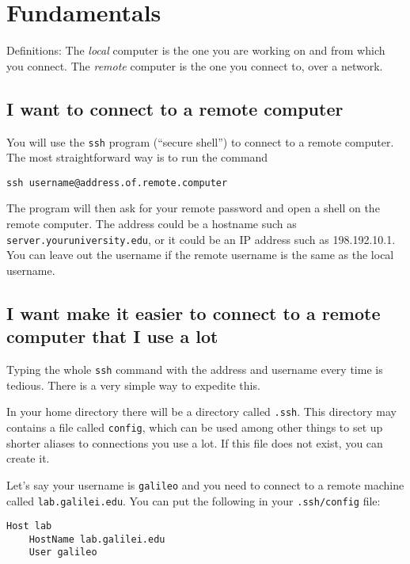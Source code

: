 \section{Fundamentals}

Definitions: The \emph{local} computer is the one you are working on and from
which you connect. The \emph{remote} computer is the one you connect to, over a
network.

\subsection{I want to connect to a remote computer}

You will use the {\tt ssh} program (``secure shell'') to connect to a remote
computer. The most straightforward way is to run the command

\begin{verbatim}
ssh username@address.of.remote.computer
\end{verbatim}

The program will then ask for your remote password and open a shell on the
remote computer. The address could be a hostname such as {\tt
server.youruniversity.edu}, or it could be an IP address such as 198.192.10.1.
You can leave out the username if the remote username is the same as the local
username.

\subsection{I want make it easier to connect to a remote computer that I use a
lot}

Typing the whole {\tt ssh} command with the address and username every time is
tedious. There is a very simple way to expedite this.

In your home directory there will be a directory called {\tt .ssh}. This
directory may contains a file called {\tt config}, which can be used among
other things to set up shorter aliases to connections you use a lot. If this
file does not exist, you can create it.

Let's say your username is {\tt galileo} and you need to connect to a remote
machine called {\tt lab.galilei.edu}. You can put the following in your
{\tt .ssh/config} file:

\begin{verbatim}
Host lab
    HostName lab.galilei.edu
    User galileo
\end{verbatim}

